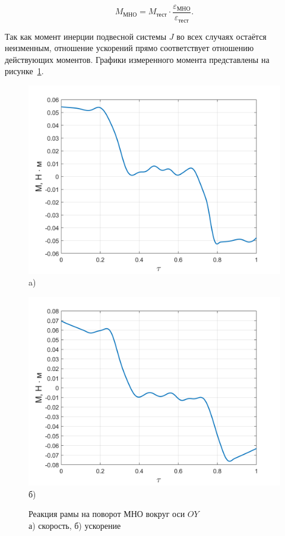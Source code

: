 \begin{equation}
	M_{\text{МНО}} = M_{\text{тест}} \cdot \frac{\varepsilon_{\text{МНО}}}{\varepsilon_{\text{тест}}}.
\end{equation}

Так как момент инерции подвесной системы $J$ во всех случаях остаётся неизменным, отношение ускорений прямо соответствует отношению действующих моментов. Графики измеренного момента представлены на рисунке~\cref{fig:omn-mom}.




\begin{figure}[!h]
	\begin{minipage}[b][][b]{0.49\linewidth}\centering
		\includegraphics[width=0.9\linewidth]{matlab/img/oz-gyro-mom.png} \\ a)
	\end{minipage}
	\hfill
	\begin{minipage}[b][][b]{0.49\linewidth}\centering
		\includegraphics[width=0.9\linewidth]{matlab/img/oy-gyro-mom.png} \\ б)
	\end{minipage}
	\caption{Реакция рамы на поворот МНО вокруг оси $OY$ \\ а) скорость, б) ускорение }
	\label{fig:omn-mom}
\end{figure}

